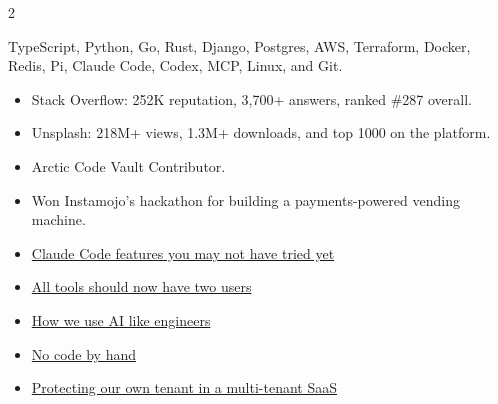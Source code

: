 \documentclass[10pt,a4paper,withhyper,ragged2e]{altacv}
\begin{document}
\begin{paracol}{2}

TypeScript, Python, Go, Rust, Django, Postgres, AWS, Terraform, Docker, Redis, Pi, Claude Code, Codex, MCP, Linux, and Git.



\divider


\divider


\divider


\divider



\begin{itemize}
\item Stack Overflow: 252K reputation, 3,700+ answers, ranked \#287 overall.
\item Unsplash: 218M+ views, 1.3M+ downloads, and top 1000 on the platform.
\item Arctic Code Vault Contributor.
\item Won Instamojo's hackathon for building a payments-powered vending machine.
\end{itemize}


\begin{itemize}
\item \href{https://ashwch.com/claude-code-features-you-may-not-have-tried.html}{Claude Code features you may not have tried yet}
\item \href{https://ashwch.com/all-tools-should-now-have-two-users.html}{All tools should now have two users}
\item \href{https://ashwch.com/how-we-use-ai-like-engineers.html}{How we use AI like engineers}
\item \href{https://ashwch.com/no-code-by-hand-agentic-platform-acceleration.html}{No code by hand}
\item \href{https://ashwch.com/protecting-our-own-tenant-in-a-multi-tenant-saas.html}{Protecting our own tenant in a multi-tenant SaaS}
\end{itemize}


\end{paracol}
\end{document}
